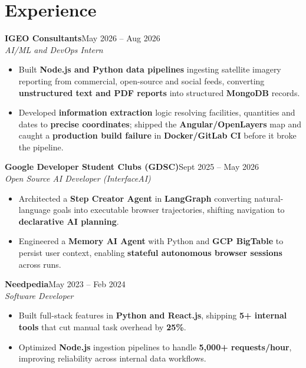 \documentclass[10pt]{article}
\newcommand{\role}[3]{%
  \vspace{1pt}%
  \textbf{#1}\hfill{#2}\\%
  \textit{#3}\vspace{1pt}%
}
\begin{document}
\section{Experience}

\role{IGEO Consultants}{May 2026 -- Aug 2026}{AI/ML and DevOps Intern}
\begin{itemize}
  \item Built \textbf{Node.js and Python data pipelines} ingesting satellite imagery reporting from commercial, open-source and social feeds, converting \textbf{unstructured text and PDF reports} into structured \textbf{MongoDB} records.
  \item Developed \textbf{information extraction} logic resolving facilities, quantities and dates to \textbf{precise coordinates}; shipped the \textbf{Angular/OpenLayers} map and caught a \textbf{production build failure} in \textbf{Docker/GitLab CI} before it broke the pipeline.
\end{itemize}

\role{Google Developer Student Clubs (GDSC)}{Sept 2025 -- May 2026}{Open Source AI Developer (InterfaceAI)}
\begin{itemize}
  \item Architected a \textbf{Step Creator Agent} in \textbf{LangGraph} converting natural-language goals into executable browser trajectories, shifting navigation to \textbf{declarative AI planning}.
  \item Engineered a \textbf{Memory AI Agent} with Python and \textbf{GCP BigTable} to persist user context, enabling \textbf{stateful autonomous browser sessions} across runs.
\end{itemize}

\role{Needpedia}{May 2023 -- Feb 2024}{Software Developer}
\begin{itemize}
  \item Built full-stack features in \textbf{Python and React.js}, shipping \textbf{5+ internal tools} that cut manual task overhead by \textbf{25\%}.
  \item Optimized \textbf{Node.js} ingestion pipelines to handle \textbf{5,000+ requests/hour}, improving reliability across internal data workflows.
\end{itemize}

\end{document}
